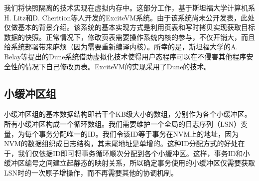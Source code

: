 我们将快照隔离的技术实现在虚拟内存中。这部分工作，基于斯坦福大学计算机系H. Litz和D. Cherition等人开发的ExciteVM系统。由于该系统尚未公开发表，此处仅做基本的背景介绍。该系统的基本实现方式是利用页表和写时拷贝实现获取目标数据的快照。正常情况下，修改页表需要操作系统内核的参与，不仅开销大，而且给系统部署带来麻烦（因为需要重新编译内核）。所幸的是，斯坦福大学的A. Belay等提出的Dune系统\cite{Belay:2012:DSU:2387880.2387913}借助虚拟化技术使得用户态程序可以在不侵害其他程序安全性的情况下自己修改页表。ExciteVM的实现采用了Dune的技术。

\subsection{小缓冲区组}

小缓冲区组的基本数据结构即若干个KB级大小的数组，分别作为各个小缓冲区。所有小缓冲区构成一个循环数组。我们需要维护一个全局的日志序列（LSN）变量，为每个事务分配唯一的ID。我们令该ID等于事务在NVM上的地址，因为NVM的数据组织成日志结构，其末尾地址是单增的。这种ID分配方式的好处在于，我们仅依据ID即可将事务循环顺次分配到各个小缓冲区。这样，事务ID和小缓冲区编号之间建立起静态的映射关系，所以确定事务使用的小缓冲区仅需要获取LSN时的一次原子增操作，而不再需要其他的协调机制。

